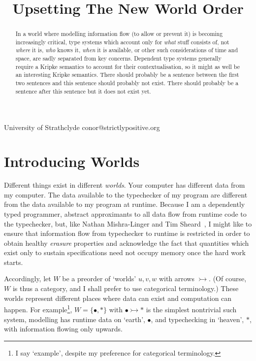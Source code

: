 \documentclass{sigplanconf}
\begin{document}
\title{Upsetting The New World Order}
           {University of Strathclyde}
           {conor@strictlypositive.org}
\maketitle

\begin{abstract}
  In a world where modelling information flow (to allow or prevent it)
  is becoming increasingly critical, type systems which account only
  for \emph{what} stuff consists of, not \emph{where} it is,
  \emph{who} knows it, \emph{when} it is available, or other such
  considerations of time and space, are sadly separated from key
  concerns.  Dependent type systems generally require a Kripke
  semantics to account for their contextualisation, so it might as
  well be an interesting Kripke semantics. There should probably be a
  sentence between the first two sentences and this sentence should
  probably not exist. There should probably be a sentence after this
  sentence but it does not exist yet.
\end{abstract}


\section{Introducing Worlds}

Different things exist in different \emph{worlds}. Your computer has
different data from my computer. The data available to the typechecker
of my program are different from the data available to my program at
runtime. Because I am a dependently typed programmer, abstract
approximants to all data flow from runtime code to the typechecker,
but, like Nathan Mishra-Linger and Tim
Sheard~\cite{DBLP:conf/fossacs/Mishra-LingerS08}, I might like to
ensure that information flow from typechecker to runtime is
restricted in order to obtain healthy \emph{erasure} properties and
acknowledge the fact that quantities which exist only to sustain
specifications need not occupy memory once the hard work starts.

\newcommand{\wto}{\rightarrowtail}
\newcommand{\hb}{\!:\!}
\newcommand{\Ty}{\pentagram}
\newcommand{\earth}{\bullet}
\newcommand{\heaven}{\ast}
\newcommand{\tn}[1]{\vdash #1 \;}

Accordingly, let $W$ be a preorder of `worlds' $u,v,w$ with arrows
$\wto$. (Of course, $W$ is thus a category, and I shall prefer to use
categorical terminology.)  These worlds represent different places
where data can exist and computation can happen.  For
example\footnote{I say `example', despite my preference for
  categorical terminology.}, $W=\{\earth,\heaven\}$ with $\earth \wto
\heaven$ is the simplest nontrivial such system, modelling has runtime
data on `earth', $\earth$, and typechecking in `heaven', $\heaven$,
with information flowing only upwards.
\end{document}
